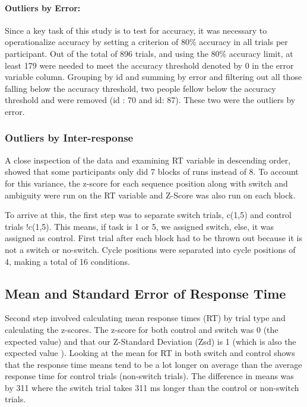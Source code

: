 \documentclass[
  11pt,
]{article}
\begin{document}
\paragraph{Outliers by Error:}\label{outliers-by-error}

Since a key task of this study is to test for accuracy, it was necessary
to operationalize accuracy by setting a criterion of 80\% accuracy in
all trials per participant. Out of the total of 896 trials, and using
the 80\% accuracy limit, at least 179 were needed to meet the accuracy
threshold denoted by 0 in the error variable column. Grouping by id and
summing by error and filtering out all those falling below the accuracy
threshold, two people fellow below the accuracy threshold and were
removed (id : 70 and id: 87). These two were the outliers by error.

\subsubsection{Outliers by
Inter-response}\label{outliers-by-inter-response}

A close inspection of the data and examining RT variable in descending
order, showed that some participants only did 7 blocks of runs instead
of 8. To account for this variance, the z-score for each sequence
position along with switch and ambiguity were run on the RT variable and
Z-Score was also run on each block.

To arrive at this, the first step was to separate switch trials, c(1,5)
and control trials !c(1,5). This means, if task is 1 or 5, we assigned
switch, else, it was assigned as control. First trial after each block
had to be thrown out because it is not a switch or no-switch. Cycle
positions were separated into cycle positions of 4, making a total of 16
conditions.

\subsection{Mean and Standard Error of Response
Time}\label{mean-and-standard-error-of-response-time}

Second step involved calculating mean response times (RT) by trial type
and calculating the z-scores. The z-score for both control and switch
was 0 (the expected value) and that our Z-Standard Deviation (Zsd) is 1
(which is also the expected value ). Looking at the mean for RT in both
switch and control shows that the response time means tend to be a lot
longer on average than the average response time for control trials
(non-switch trials). The difference in means was by 311 where the switch
trial takes 311 ms longer than the control or non-switch trials.
\end{document}
